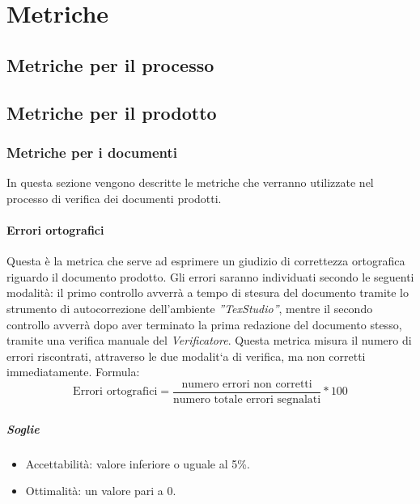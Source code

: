 \newpage
\section{Metriche}
\subsection{Metriche per il processo}
\label{AppB:metricheProc}
\subsection{Metriche per il prodotto}
\label{AppB:metricheProd}
\subsubsection{Metriche per i documenti}
\label{AppB:metricheDoc}
In questa sezione vengono descritte le metriche che verranno utilizzate nel processo di verifica dei documenti prodotti.
\paragraph{Errori ortografici}
Questa è la metrica che serve ad esprimere un giudizio di correttezza ortografica riguardo il documento prodotto. Gli errori saranno individuati secondo le seguenti modalità:
il primo controllo avverrà a tempo di stesura del documento tramite lo strumento di autocorrezione dell'ambiente \emph{''TexStudio''}, mentre il secondo controllo avverrà dopo aver terminato la prima redazione del documento stesso, tramite una verifica manuale del \emph{Verificatore}.
Questa metrica misura il numero di errori riscontrati, attraverso le due modalit`a di verifica, ma
non corretti immediatamente.
\newline Formula:
\begin{displaymath}
\mbox{Errori ortografici}= \frac{\mbox{numero errori non corretti}}{\mbox{numero totale errori segnalati}}*100
\end{displaymath}

\subparagraph{Soglie}
\begin{itemize}
\item Accettabilità: valore inferiore o uguale al 5\%.
\item Ottimalità: un valore pari a 0.
\end{itemize}


